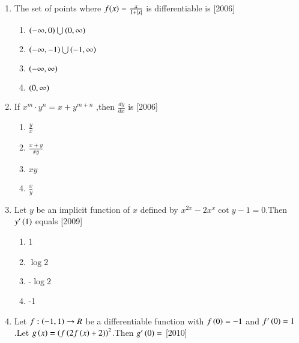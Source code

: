\documentclass[journal,12pt,twocolumn]{IEEEtran}
\theoremstyle{remark}
\begin{document}
\begin{enumerate}
\begin{multicols}{4}
   
    \begin{enumerate}
    \item 24
    \item 36
    \item 12
    \item 18
    \end{enumerate}
     \end{multicols}
    \item The set of points where $f(x)=\frac{x}{1+\left\vert x\right\vert}$ is differentiable is \hfill[2006]
    \begin{multicols}{2}
    
    \begin{enumerate}
    \item $\left(-\infty,0\right)\bigcup\left(0,\infty\right)$
    \item $\left(-\infty,-1\right)\bigcup\left(-1,\infty\right)$
    \item $\left(-\infty,\infty\right)$
    \item $\left(0,\infty\right)$
    \end{enumerate}
    \end{multicols}
    \item If $x^m\cdot y^n={x+y}^{m+n}$ ,then $\frac{dy}{dx}$ is \hfill[2006]
    \begin{multicols}{4}
        
  
    \begin{enumerate}
    \item $\frac{y}{x}$
    \item $\frac{x+y}{xy}$
    \item $xy$
    \item $\frac{x}{y}$
    \end{enumerate}
    \end{multicols}
    \item Let $y$ be an implicit function of $x$ defined by $x^{2x}-2x^x\cot{y}-1=0$.Then $y^{\prime}\left(1\right)$ equals
    \hfill[2009]
    \begin{multicols}{4}
    \begin{enumerate}
    \item 1
    \item $\log2$
    \item -$\log2$
    \item -1
    \end{enumerate}
    \end{multicols}
    \item Let $f:\left(-1,1\right)\rightarrow R$ be a differentiable function with $f\left(0\right)=-1$ and $f^{\prime}\left(0\right)=1$.Let $g\left(x\right)=\left(f\left(2f\left(x\right)+2\right)\right)^2$.Then $g^{\prime}\left(0\right)=$
	    \hfill[2010]
     \begin{multicols}{4}
         

\end{multicols}
\end{enumerate}
\end{document}
